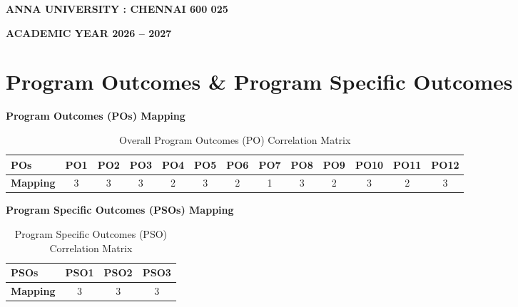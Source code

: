 \documentclass[12pt, a4paper]{report}
\begin{document}
\begin{titlepage}
    \vfill
    
    {\large\bfseries ANNA UNIVERSITY : CHENNAI 600 025\par}
    \vspace{0.2cm}
    {\large\bfseries ACADEMIC YEAR 2026 -- 2027\par}
    \vspace*{0.5cm}
\end{titlepage}

\newpage
\chapter*{Program Outcomes \& Program Specific Outcomes}

\noindent\textbf{\large Program Outcomes (POs) Mapping}
\vspace{0.3cm}

\begin{table}[H]
\centering
\small
\setlength{\tabcolsep}{3pt}
\begin{tabular}{|l|c|c|c|c|c|c|c|c|c|c|c|c|}
\hline
\textbf{POs} & \textbf{PO1} & \textbf{PO2} & \textbf{PO3} & \textbf{PO4} & \textbf{PO5} & \textbf{PO6} & \textbf{PO7} & \textbf{PO8} & \textbf{PO9} & \textbf{PO10} & \textbf{PO11} & \textbf{PO12} \\
\hline
\textbf{Mapping} & 3 & 3 & 3 & 2 & 3 & 2 & 1 & 3 & 2 & 3 & 2 & 3 \\
\hline
\end{tabular}
\caption{Overall Program Outcomes (PO) Correlation Matrix}
\end{table}

\vspace{0.4cm}
\noindent\textbf{\large Program Specific Outcomes (PSOs) Mapping}
\vspace{0.3cm}

\begin{table}[H]
\centering
\setlength{\tabcolsep}{14pt}
\begin{tabular}{|l|c|c|c|}
\hline
\textbf{PSOs} & \textbf{PSO1} & \textbf{PSO2} & \textbf{PSO3} \\
\hline
\textbf{Mapping} & 3 & 3 & 3 \\
\hline
\end{tabular}
\caption{Program Specific Outcomes (PSO) Correlation Matrix}
\end{table}
\end{document}
